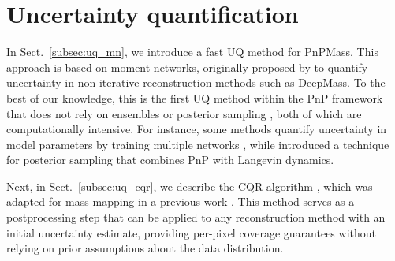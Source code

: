\documentclass{aa}
\begin{document}


\section{Uncertainty quantification}
\label{sec:uq}

In Sect.~\ref{subsec:uq_mn}, we introduce a fast UQ method for PnPMass. This approach is based on moment networks, originally proposed by \citet{Jeffrey2020a} to quantify uncertainty in non-iterative reconstruction methods such as DeepMass. To the best of our knowledge, this is the first UQ method within the PnP framework that does not rely on ensembles or posterior sampling \tocheck, both of which are computationally intensive. For instance, some methods quantify uncertainty in model parameters by training multiple networks \citep{Shi2021,Terris2024}, while \citet{Laumont2022} introduced a technique for posterior sampling that combines PnP with Langevin dynamics. %

Next, in Sect.~\ref{subsec:uq_cqr}, we describe the CQR algorithm \citep{Romano2019}, which was adapted for mass mapping in a previous work \citep{LetermeDistributionfreeUncertainty2025}. This method serves as a postprocessing step that can be applied to any reconstruction method with an initial uncertainty estimate, providing per-pixel coverage guarantees without relying on prior assumptions about the data distribution.
\end{document}
